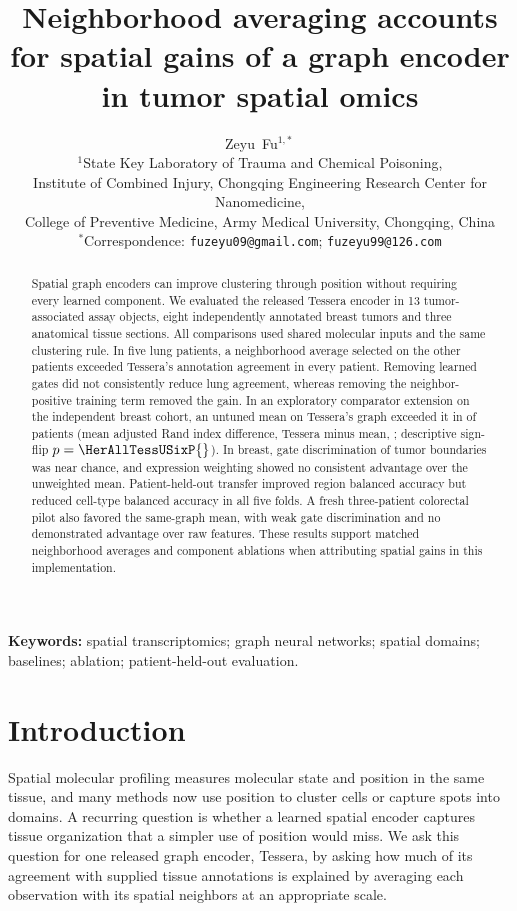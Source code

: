 \documentclass[11pt]{article}
\title{Neighborhood averaging accounts for spatial gains of a graph encoder in tumor spatial omics}
\author{Zeyu~Fu$^{1,*}$\,\orcidlink{0009-0001-8329-0108}\\[3pt]
\small $^1$State Key Laboratory of Trauma and Chemical Poisoning,\\
\small Institute of Combined Injury, Chongqing Engineering Research Center for Nanomedicine,\\
\small College of Preventive Medicine, Army Medical University, Chongqing, China\\
\small $^*$Correspondence: \texttt{fuzeyu09@gmail.com}; \texttt{fuzeyu99@126.com}}
\date{}
\begin{document}
\raggedbottom\maketitle
\begin{abstract}
Spatial graph encoders can improve clustering through position without requiring every learned component. We evaluated the released Tessera encoder in 13 tumor-associated assay objects, eight independently annotated breast tumors and three anatomical tissue sections. All comparisons used shared molecular inputs and the same clustering rule. In five lung patients, a neighborhood average selected on the other patients exceeded Tessera's annotation agreement in every patient. Removing learned gates did not consistently reduce lung agreement, whereas removing the neighbor-positive training term removed the gain. In an exploratory comparator extension on the independent breast cohort, an untuned mean on Tessera's graph exceeded it in \HerAllTessUSixNeg{} of \HerPatients{} patients (mean adjusted Rand index difference, Tessera minus mean, \HerAllTessUSixMean{}; descriptive sign-flip \(p=\HerAllTessUSixP{}\)). In breast, gate discrimination of tumor boundaries was near chance, and expression weighting showed no consistent advantage over the unweighted mean. Patient-held-out transfer improved region balanced accuracy but reduced cell-type balanced accuracy in all five folds. A fresh three-patient colorectal pilot also favored the same-graph mean, with weak gate discrimination and no demonstrated advantage over raw features. These results support matched neighborhood averages and component ablations when attributing spatial gains in this implementation.
\end{abstract}
\noindent\textbf{Keywords:} spatial transcriptomics; graph neural networks; spatial domains; baselines; ablation; patient-held-out evaluation.

\section{Introduction}
Spatial molecular profiling measures molecular state and position in the same tissue, and many methods now use position to cluster cells or capture spots into domains. A recurring question is whether a learned spatial encoder captures tissue organization that a simpler use of position would miss. We ask this question for one released graph encoder, Tessera, by asking how much of its agreement with supplied tissue annotations is explained by averaging each observation with its spatial neighbors at an appropriate scale.
\end{document}
